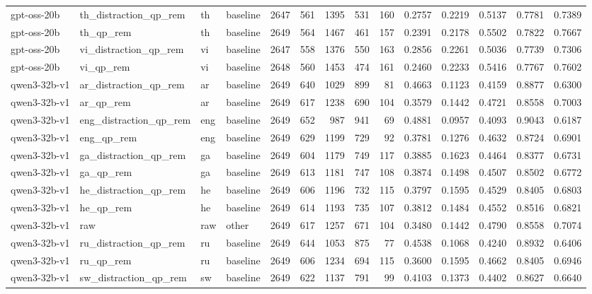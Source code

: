 \begin{table}
\begin{tabular}{llllrrrrrlllll}
gpt-oss-20b & th_distraction_qp_rem & th & baseline & 2647 & 561 & 1395 & 531 & 160 & 0.2757 & 0.2219 & 0.5137 & 0.7781 & 0.7389 \\
gpt-oss-20b & th_qp_rem & th & baseline & 2649 & 564 & 1467 & 461 & 157 & 0.2391 & 0.2178 & 0.5502 & 0.7822 & 0.7667 \\
gpt-oss-20b & vi_distraction_qp_rem & vi & baseline & 2647 & 558 & 1376 & 550 & 163 & 0.2856 & 0.2261 & 0.5036 & 0.7739 & 0.7306 \\
gpt-oss-20b & vi_qp_rem & vi & baseline & 2648 & 560 & 1453 & 474 & 161 & 0.2460 & 0.2233 & 0.5416 & 0.7767 & 0.7602 \\
qwen3-32b-v1 & ar_distraction_qp_rem & ar & baseline & 2649 & 640 & 1029 & 899 & 81 & 0.4663 & 0.1123 & 0.4159 & 0.8877 & 0.6300 \\
qwen3-32b-v1 & ar_qp_rem & ar & baseline & 2649 & 617 & 1238 & 690 & 104 & 0.3579 & 0.1442 & 0.4721 & 0.8558 & 0.7003 \\
qwen3-32b-v1 & eng_distraction_qp_rem & eng & baseline & 2649 & 652 & 987 & 941 & 69 & 0.4881 & 0.0957 & 0.4093 & 0.9043 & 0.6187 \\
qwen3-32b-v1 & eng_qp_rem & eng & baseline & 2649 & 629 & 1199 & 729 & 92 & 0.3781 & 0.1276 & 0.4632 & 0.8724 & 0.6901 \\
qwen3-32b-v1 & ga_distraction_qp_rem & ga & baseline & 2649 & 604 & 1179 & 749 & 117 & 0.3885 & 0.1623 & 0.4464 & 0.8377 & 0.6731 \\
qwen3-32b-v1 & ga_qp_rem & ga & baseline & 2649 & 613 & 1181 & 747 & 108 & 0.3874 & 0.1498 & 0.4507 & 0.8502 & 0.6772 \\
qwen3-32b-v1 & he_distraction_qp_rem & he & baseline & 2649 & 606 & 1196 & 732 & 115 & 0.3797 & 0.1595 & 0.4529 & 0.8405 & 0.6803 \\
qwen3-32b-v1 & he_qp_rem & he & baseline & 2649 & 614 & 1193 & 735 & 107 & 0.3812 & 0.1484 & 0.4552 & 0.8516 & 0.6821 \\
qwen3-32b-v1 & raw & raw & other & 2649 & 617 & 1257 & 671 & 104 & 0.3480 & 0.1442 & 0.4790 & 0.8558 & 0.7074 \\
qwen3-32b-v1 & ru_distraction_qp_rem & ru & baseline & 2649 & 644 & 1053 & 875 & 77 & 0.4538 & 0.1068 & 0.4240 & 0.8932 & 0.6406 \\
qwen3-32b-v1 & ru_qp_rem & ru & baseline & 2649 & 606 & 1234 & 694 & 115 & 0.3600 & 0.1595 & 0.4662 & 0.8405 & 0.6946 \\
qwen3-32b-v1 & sw_distraction_qp_rem & sw & baseline & 2649 & 622 & 1137 & 791 & 99 & 0.4103 & 0.1373 & 0.4402 & 0.8627 & 0.6640 \\

\end{tabular}
\end{table}
